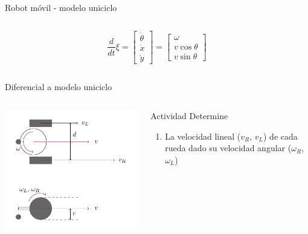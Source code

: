 \documentclass[presentation,aspectratio=169]{beamer}
\begin{document}
\begin{frame}[label={sec:org3489ce1}]{Robot móvil - modelo uniciclo}
\begin{columns}
\begin{column}{0.6\columnwidth}
\[\frac{d}{dt} \xi = \begin{bmatrix} \dot{\theta}\\\dot{x}\\\dot{y} \end{bmatrix} = \begin{bmatrix} \omega\\ v\cos\theta\\v\sin\theta\end{bmatrix} \]
\end{column}
\end{columns}
\end{frame}



\begin{frame}[label={sec:orga45f18e}]{Diferencial a modelo uniciclo}
\begin{columns}
\begin{column}{0.4\columnwidth}
\begin{center}
 \includegraphics[width=1.0\linewidth]{../figures/unicycle-model-details}
\end{center}
\end{column}

\begin{column}{0.6\columnwidth}
\pause

\alert{Actividad} Determine

\begin{enumerate}
\item La velocidad lineal (\(v_R\), \(v_L\)) de cada rueda dado su velocidad angular (\(\omega_R\), \(\omega_L\))


\end{enumerate}
\end{column}
\end{columns}
\end{frame}
\end{document}
